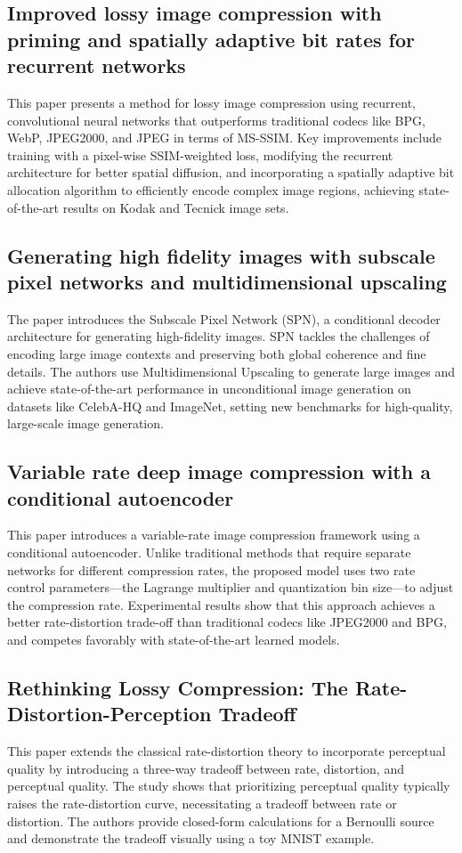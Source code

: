 \documentclass[conference]{IEEEtran}
\begin{document}
\subsection{Improved lossy image compression with priming and spatially adaptive bit rates for recurrent networks \cite{hf06013}} 
This paper presents a method for lossy image compression using recurrent, convolutional neural networks that outperforms traditional codecs like BPG, WebP, JPEG2000, and JPEG in terms of MS-SSIM. Key improvements include training with a pixel-wise SSIM-weighted loss, modifying the recurrent architecture for better spatial diffusion, and incorporating a spatially adaptive bit allocation algorithm to efficiently encode complex image regions, achieving state-of-the-art results on Kodak and Tecnick image sets.

\subsection{Generating high fidelity images with subscale pixel networks and multidimensional upscaling \cite{hf06014}} 
The paper introduces the Subscale Pixel Network (SPN), a conditional decoder architecture for generating high-fidelity images. SPN tackles the challenges of encoding large image contexts and preserving both global coherence and fine details. The authors use Multidimensional Upscaling to generate large images and achieve state-of-the-art performance in unconditional image generation on datasets like CelebA-HQ and ImageNet, setting new benchmarks for high-quality, large-scale image generation.

\subsection{Variable rate deep image compression with a conditional autoencoder \cite{hf06015}} 
This paper introduces a variable-rate image compression framework using a conditional autoencoder. Unlike traditional methods that require separate networks for different compression rates, the proposed model uses two rate control parameters—the Lagrange multiplier and quantization bin size—to adjust the compression rate. Experimental results show that this approach achieves a better rate-distortion trade-off than traditional codecs like JPEG2000 and BPG, and competes favorably with state-of-the-art learned models.

\subsection{Rethinking Lossy Compression: The Rate-Distortion-Perception Tradeoff \cite{hf06016}} 
This paper extends the classical rate-distortion theory to incorporate perceptual quality by introducing a three-way tradeoff between rate, distortion, and perceptual quality. The study shows that prioritizing perceptual quality typically raises the rate-distortion curve, necessitating a tradeoff between rate or distortion. The authors provide closed-form calculations for a Bernoulli source and demonstrate the tradeoff visually using a toy MNIST example.
\end{document}
